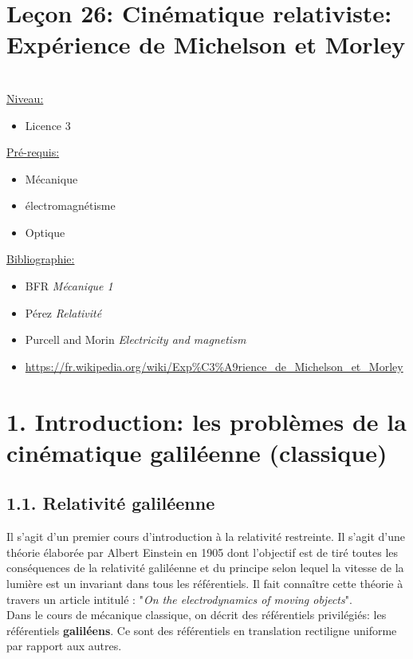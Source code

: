 \documentclass[french, a4paper, 10pt, twocolumn, landscape]{article}
\begin{document}
\clearpage


\section*{Leçon 26: Cinématique relativiste: Expérience de Michelson et Morley}
\hrulefill\\
	\underline{Niveau:}
	\begin{itemize}
		\item Licence 3
	\end{itemize}
	\underline{Pré-requis:} 
	\begin{itemize}
		\item Mécanique
		\item électromagnétisme
		\item Optique
	\end{itemize}
	\underline{Bibliographie:}
	\begin{itemize}
		\item BFR \textit{Mécanique 1}
		\item Pérez \textit{Relativité}
		\item Purcell and Morin \textit{Electricity and magnetism}
		\item \url{https://fr.wikipedia.org/wiki/Exp%C3%A9rience_de_Michelson_et_Morley}
	\end{itemize}
\hrulefill

\section*{1. Introduction: les problèmes de la cinématique galiléenne (classique)}

\subsection*{1.1. Relativité galiléenne}

Il s'agit d'un premier cours d'introduction à la relativité restreinte. Il s'agit d'une théorie élaborée par Albert Einstein en 1905 dont l'objectif est de tiré toutes les conséquences de la relativité galiléenne et du principe selon lequel la vitesse de la lumière est un invariant dans tous les référentiels. Il fait connaître cette théorie à travers un article intitulé : "\textit{On the electrodynamics of moving objects}".\\[.5cm]

Dans le cours de mécanique classique, on décrit des référentiels privilégiés: les référentiels \textbf{galiléens}. Ce sont des référentiels en translation rectiligne uniforme par rapport aux autres. 
\end{document}
